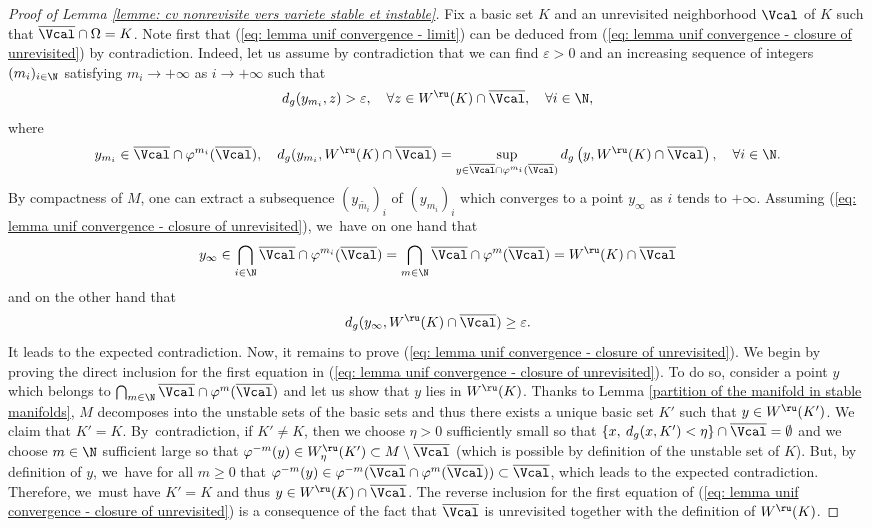 \begin{proof}[Proof of Lemma \ref{lemme: cv nonrevisite vers variete stable et instable}]
Fix a basic set $K$ and an unrevisited neighborhood $\Vcal$ of $K$ such that $\overline{\Vcal} \cap \Omega = K$. Note first that (\ref{eq: lemma unif convergence - limit}) can be deduced from (\ref{eq: lemma unif convergence - closure of unrevisited}) by contradiction. Indeed, let us assume by contradiction that we can find $\varepsilon > 0$ and an increasing sequence of integers $(m_i)_{i \in \N}$ satisfying $m_i \to +\infty$ as $i \to +\infty$ such that
\[
d_g (y_{m_i},z) > \varepsilon, \quad \forall z \in W^\ru (K) \cap \overline{\Vcal}, \quad \forall i \in \N,
\]
where
\[
y_{m_i} \in \overline{\Vcal} \cap \varphi^{m_i} (\overline{\Vcal}), \quad d_g (y_{m_i},W^{\ru} (K) \cap \overline{\Vcal}) = \sup_{y \in \overline{\Vcal} \cap \varphi^{m_i} (\overline{\Vcal})} d_g \left(y, W^{\ru} (K) \cap \overline{\Vcal} \right), \quad \forall i \in \N.
\]
By compactness of $M$, one can extract a subsequence $(y_{\widetilde{m_i}})_i$ of $(y_{m_i})_i$ which converges to a point $y_{\infty}$ as $i$ tends to $+\infty$. Assuming (\ref{eq: lemma unif convergence - closure of unrevisited}), we~have on one hand that
\[
y_{\infty} \in \bigcap_{i \in \N} \overline{\Vcal} \cap \varphi^{m_i} (\overline{\Vcal}) = \bigcap_{m \in \N} \overline{\Vcal} \cap \varphi^{m} (\overline{\Vcal}) = W^\ru (K) \cap \overline{\Vcal}
\]
and on the other hand that
\[
d_g (y_{\infty}, W^\ru (K) \cap \overline{\Vcal}) \geq \varepsilon.
\]
It leads to the expected contradiction. Now, it remains to prove (\ref{eq: lemma unif convergence - closure of unrevisited}). We begin by proving the direct inclusion for the first equation in (\ref{eq: lemma unif convergence - closure of unrevisited}). To do so, consider a point $y$ which belongs to $\bigcap_{m \in \N} \overline{\Vcal} \cap \varphi^m (\overline{\Vcal})$ and let us show that $y$ lies in $W^\ru (K)$. Thanks to Lemma \ref{partition of the manifold in stable manifolds}, $M$ decomposes into the unstable sets of the basic sets and thus there exists a unique basic set $K'$ such that $ y \in W^\ru (K')$. We claim that $K' = K$. By~contradiction, if $K' \neq K$, then we choose $\eta > 0$ sufficiently small so that $\{x, \: d_g(x,K') < \eta\} \cap \overline{\Vcal} = \emptyset$ and we choose $m \in \N$ sufficient large so that $\varphi^{-m} (y) \in W_{\eta}^\ru (K') \subset M \setminus \overline{\Vcal}$ (which is possible by definition of the unstable set of $K$). But, by definition of $y$, we~have for all $m \geq 0$ that $\varphi^{-m} (y) \in \varphi^{-m} (\overline{\Vcal} \cap \varphi^m (\overline{\Vcal})) \subset \overline{\Vcal}$, which leads to the expected contradiction. Therefore, we~must have $K' = K$ and thus $y \in W^\ru (K) \cap \overline{\Vcal}$. The reverse inclusion for the first equation of (\ref{eq: lemma unif convergence - closure of unrevisited}) is a consequence of the fact that $\overline{\Vcal}$ is unrevisited together with the definition of $W^\ru (K)$.


\end{proof}
